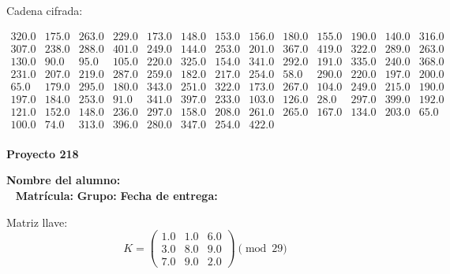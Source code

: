 \documentclass[12pt]{article}
\begin{document}
Cadena cifrada:
\begin{center}
$\begin{array}{lllllllllllll}
320.0 & 175.0 & 263.0 & 229.0 & 173.0 & 148.0 & 153.0 & 156.0 & 180.0 & 155.0 & 190.0 & 140.0 & 316.0\\
307.0 & 238.0 & 288.0 & 401.0 & 249.0 & 144.0 & 253.0 & 201.0 & 367.0 & 419.0 & 322.0 & 289.0 & 263.0\\
130.0 & 90.0 & 95.0 & 105.0 & 220.0 & 325.0 & 154.0 & 341.0 & 292.0 & 191.0 & 335.0 & 240.0 & 368.0\\
231.0 & 207.0 & 219.0 & 287.0 & 259.0 & 182.0 & 217.0 & 254.0 & 58.0 & 290.0 & 220.0 & 197.0 & 200.0\\
65.0 & 179.0 & 295.0 & 180.0 & 343.0 & 251.0 & 322.0 & 173.0 & 267.0 & 104.0 & 249.0 & 215.0 & 190.0\\
197.0 & 184.0 & 253.0 & 91.0 & 341.0 & 397.0 & 233.0 & 103.0 & 126.0 & 28.0 & 297.0 & 399.0 & 192.0\\
121.0 & 152.0 & 148.0 & 236.0 & 297.0 & 158.0 & 208.0 & 261.0 & 265.0 & 167.0 & 134.0 & 203.0 & 65.0\\
100.0 & 74.0 & 313.0 & 396.0 & 280.0 & 347.0 & 254.0 & 422.0\\
\end{array}$
\end{center}

\newpage


\textbf{Proyecto 218}

\textbf{Nombre del alumno:} \underline{\hspace{13cm}}\\\
\vspace{1cm}
\textbf{Matrícula:} \underline{\hspace{4cm}} \hspace{1cm}
\textbf{Grupo:} \underline{\hspace{2cm}}
\textbf{Fecha de entrega:} \underline{\hspace{2cm}}

\medskip

Matriz llave:
\[
K = \begin{pmatrix}
1.0 & 1.0 & 6.0\\
3.0 & 8.0 & 9.0\\
7.0 & 9.0 & 2.0
\end{pmatrix} \pmod{29}
\]
\end{document}
